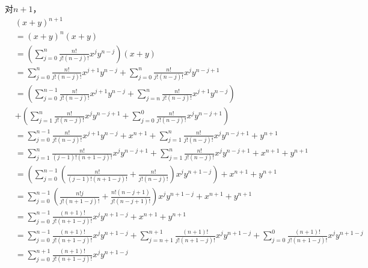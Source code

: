 \documentclass{article}
\theoremstyle{mystyle}
\begin{document}
对$n+1$，
\begin{align*}
         & (x+y)^{n+1}                                                                                        \\
         & = (x+y)^n (x+y)                                                                                    \\
         & = (\sum \limits_{j=0}^n \frac{n!}{j!(n-j)!} x^j y^{n-j}) (x+y)                                     \\
         & =
        \sum \limits_{j=0}^n \frac{n!}{j!(n-j)!} x^{j+1} y^{n-j}
        +
        \sum \limits_{j=0}^n \frac{n!}{j!(n-j)!} x^j y^{n-j+1}                                                \\
         & =
        (
        \sum \limits_{j=0}^{n-1} \frac{n!}{j!(n-j)!} x^{j+1} y^{n-j}
        +
        \sum \limits_{j=n}^{n} \frac{n!}{j!(n-j)!} x^{j+1} y^{n-j}
        )                                                                                                     \\
         & +
        (
        \sum \limits_{j=1}^n \frac{n!}{j!(n-j)!} x^j y^{n-j+1}
        +
        \sum \limits_{j=0}^0 \frac{n!}{j!(n-j)!} x^j y^{n-j+1}
        )                                                                                                     \\
         & = \sum \limits_{j=0}^{n-1} \frac{n!}{j!(n-j)!} x^{j+1} y^{n-j} + x^{n+1}
        + \sum \limits_{j=1}^n \frac{n!}{j!(n-j)!} x^j y^{n-j+1} + y^{n+1}                                    \\
         & = \sum \limits_{j=1}^{n} \frac{n!}{(j-1)!(n+1-j)!} x^{j} y^{n-j+1}
        + \sum \limits_{j=1}^n \frac{n!}{j!(n-j)!} x^j y^{n-j+1}
        + x^{n+1} + y^{n+1}                                                                                   \\
         & = (\sum \limits_{j=0}^{n-1} (\frac{n!}{(j-1)!(n+1-j)!} + \frac{n!}{j!(n-j)!}) x^{j} y^{n+1-j})
        + x^{n+1} + y^{n+1}                                                                                   \\
         & = \sum \limits_{j=0}^{n-1} (\frac{n!j}{j!(n+1-j)!} + \frac{n!(n-j+1)}{j!(n-j+1)!}) x^{j} y^{n+1-j}
        + x^{n+1} + y^{n+1}                                                                                   \\
         & =  \sum \limits_{j=0}^{n-1} \frac{(n+1)!}{j!(n+1-j)!} x^{j} y^{n+1-j}
        + x^{n+1} + y^{n+1}                                                                                   \\
         & =  \sum \limits_{j=0}^{n-1} \frac{(n+1)!}{j!(n+1-j)!} x^{j} y^{n+1-j}
        +  \sum \limits_{j=n+1}^{n+1} \frac{(n+1)!}{j!(n+1-j)!} x^{j} y^{n+1-j}
        +  \sum \limits_{j=0}^{0} \frac{(n+1)!}{j!(n+1-j)!} x^{j} y^{n+1-j}                                   \\
         & = \sum \limits_{j=0}^{n+1} \frac{(n+1)!}{j!(n+1-j)!} x^{j} y^{n+1-j}
\end{align*}
\end{document}
